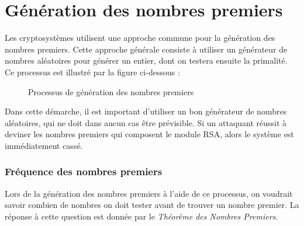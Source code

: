 \section{Génération des nombres premiers}

	Les cryptosystèmes utilisent une approche commune pour la génération des nombres premiers. Cette approche générale consiste à utiliser un générateur de nombres aléatoires pour générer un entier, dont on testera ensuite la primalité. Ce processus est illustré par la figure ci-dessous :
	
	\begin{figure}[H]
		\begin{center}
		\end{center}
		\caption{Processus de génération des nombres premiers}\label{fig:M2}
	\end{figure}
	Dans cette démarche, il est important d'utiliser un bon générateur de nombres aléatoires, qui ne doit dans aucun cas être prévisible. Si un attaquant réussit à deviner les nombres premiers qui composent le module RSA, alors le système est immédiatement cassé.

	\subsubsection*{Fréquence des nombres premiers}
	Lors de la génération des nombres premiers à l'aide de ce processus, on voudrait savoir combien de nombres on doit tester avant de trouver un nombre premier. La réponse à cette question est donnée par le \textit{Théorème des Nombres Premiers}.
	
